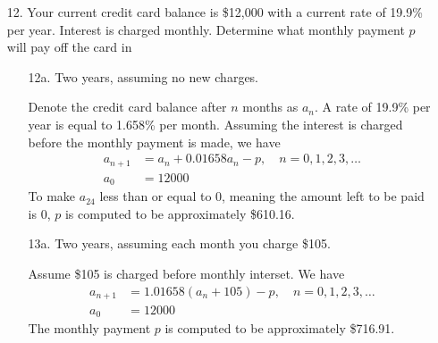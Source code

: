 \documentclass[10pt]{report}
\begin{document}
\begin{enumerate}
	\item [12.]
	Your current credit card balance is \$12,000 with a current rate of 19.9\% per year. Interest is charged monthly. Determine what monthly payment $p$ will pay off the card in 
	
	\begin{enumerate}
		\item [12a.]
		Two years, assuming no new charges.
		
		Denote the credit card balance after $n$ months as $a_n$. A rate of 19.9\% per year is equal to 1.658\% per month. Assuming the interest is charged before the monthly payment is made, we have
		\begin{align*}
			a_{n+1} &= a_n +  0.01658 a_n - p, \quad n=0,1,2,3,\dots\\
			a_0 &= 12000
		\end{align*}
		To make $a_{24}$ less than or equal to 0, meaning the amount left to be paid is 0, $p$ is computed to be approximately \$610.16.
		
		\item [13a.]
		Two years, assuming each month you charge \$105.
		
		Assume \$105 is charged before monthly interset. We have
		\begin{align*}
			a_{n+1} &= 1.01658 (a_n + 105) - p, \quad n=0,1,2,3,\dots\\
			a_0 &= 12000
		\end{align*}
		The monthly payment $p$ is computed to be approximately \$716.91.
	\end{enumerate}
\end{enumerate}
\end{document}
